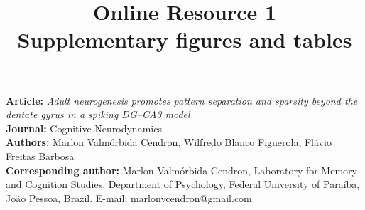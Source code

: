 \documentclass[11pt]{article}
\title{Online Resource 1\\[0.3em]
\large Supplementary figures and tables}
\author{}
\date{}
\begin{document}
\maketitle

\noindent
\textbf{Article:} \emph{Adult neurogenesis promotes pattern separation and sparsity beyond the dentate gyrus in a spiking
DG--CA3 model}\\[0.2em]
\textbf{Journal:} Cognitive Neurodynamics\\[0.2em]
\textbf{Authors:} Marlon Valmórbida Cendron, Wilfredo Blanco Figuerola, Flávio Freitas Barbosa\\[0.2em]

\textbf{Corresponding author:} Marlon Valmórbida Cendron, Laboratory for Memory and Cognition Studies, Department of Psychology,
Federal University of Paraíba, João Pessoa, Brazil. E-mail: marlonvcendron@gmail.com

\bigskip
\end{document}
